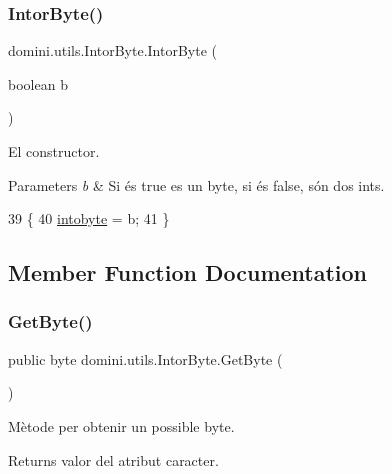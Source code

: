 \subsubsection{\texorpdfstring{Intor\+Byte()}{IntorByte()}}
{\footnotesize\ttfamily domini.\+utils.\+Intor\+Byte.\+Intor\+Byte (\begin{DoxyParamCaption}\item[{boolean}]{b }\end{DoxyParamCaption})\hspace{0.3cm}{\ttfamily [inline]}}



El constructor. 


\begin{DoxyParams}{Parameters}
{\em b} & Si és true es un byte, si és false, són dos int\textquotesingle{}s. \\
\hline
\end{DoxyParams}

\begin{DoxyCode}
39    \{
40       \hyperlink{classdomini_1_1utils_1_1IntorByte_aee013881ecae778d25cab7c0b7655528}{intobyte} = b;
41    \}
\end{DoxyCode}


\subsection{Member Function Documentation}
\mbox{\label{classdomini_1_1utils_1_1IntorByte_afd907b7001011bbca374605fb11491f4}} 
\subsubsection{\texorpdfstring{Get\+Byte()}{GetByte()}}
{\footnotesize\ttfamily public byte domini.\+utils.\+Intor\+Byte.\+Get\+Byte (\begin{DoxyParamCaption}{ }\end{DoxyParamCaption})\hspace{0.3cm}{\ttfamily [inline]}}



Mètode per obtenir un possible byte. 

\begin{DoxyReturn}{Returns}
valor del atribut caracter. 
\end{DoxyReturn}

